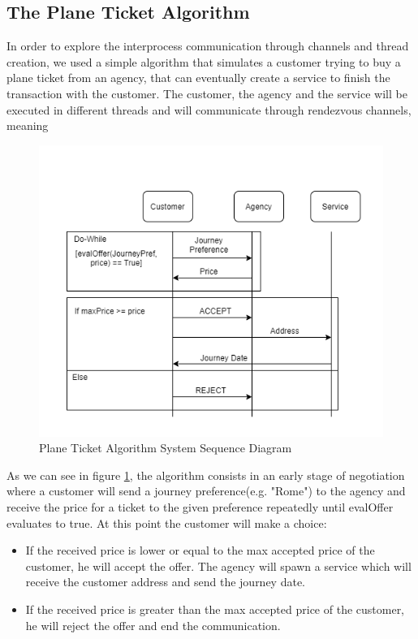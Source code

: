 \documentclass[runningheads]{llncs}
\begin{document}
\subsection{The Plane Ticket Algorithm}
\label{alg}
In order to explore the interprocess communication through channels and thread creation, we used a simple algorithm that simulates a customer trying to buy a plane ticket from an agency, that can eventually create a service to finish the transaction with the customer. The customer, the agency and the service will be executed in different threads and will communicate through rendezvous channels, meaning 
\begin{figure}[H]
\centering
\includegraphics[scale=0.4]{Algorithm.png}
\caption{Plane Ticket Algorithm System Sequence Diagram}
\label{ssd}
\end{figure}
As we can see in figure \ref{ssd}, the algorithm consists in an early stage of negotiation where a customer will send a journey preference(e.g. "Rome") to the agency and receive the price for a ticket to the given preference repeatedly until evalOffer evaluates to true.
At this point the customer will make a choice:
\begin{itemize}
\item If the received price is lower or equal to the max accepted price of the customer, he will accept the offer.
The agency will spawn a service which will receive the customer address and send the journey date.
\item If the received price is greater than the max accepted price of the customer, he will reject the offer and end the communication.
\end{itemize}
\end{document}
